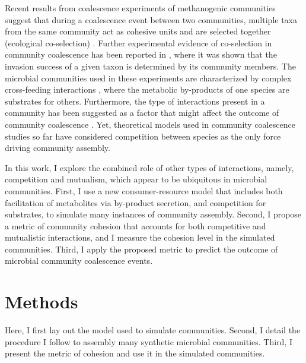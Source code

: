 \documentclass[titlepage,11pt]{article}
\begin{document}
\begin{linenumbers}
		Recent results from coalescence experiments of methanogenic communities suggest that during a coalescence event between two communities, multiple taxa from the same community act as cohesive units and are selected together (ecological co-selection) \citep{Sierocinski2017}. Further experimental evidence of co-selection in community coalescence has been reported in \citet{Lu2018}, where it was shown that the invasion success of a given taxon is determined by its community members. The microbial communities used in these experiments are characterized by complex cross-feeding interactions \citep{Hansen2007, Lawrence2012, Embree2015}, where the metabolic by-products of one species are substrates for others. Furthermore, the type of interactions present in a community has been suggested as a factor that might affect the outcome of community coalescence \citep{Castledine2020}.  Yet, theoretical models used in community coalescence studies so far have considered competition between species as the only force driving community assembly.\par 
		In this work, I explore the combined role of other types of interactions, namely, competition and mutualism, which appear to be ubiquitous in microbial communities. First, I use a new consumer-resource model that includes both facilitation of metabolites via by-product secretion, and competition for substrates, to simulate many instances of community assembly. Second, I propose a metric of community cohesion that accounts for both competitive and mutualistic interactions, and I measure the cohesion level in the simulated communities. Third, I apply the proposed metric to predict the outcome of microbial community coalescence events.
		\section{Methods}
			\hspace{15pt}Here, I first lay out the model used to simulate communities. Second, I detail the procedure I follow to assembly many synthetic microbial communities. Third, I present the metric of cohesion and use it in the simulated communities.

\end{linenumbers}
\end{document}

